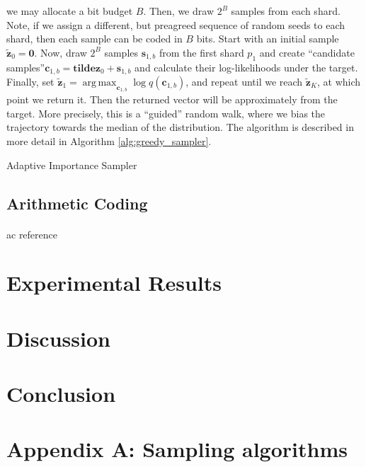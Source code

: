 \documentclass{article}
\renewcommand{\vec}[1]{\mathbf{#1}}
\DeclareMathOperator*{\argmax}{arg\,max}
\begin{document}
we may allocate a bit budget $B$. Then, we draw $2^B$ samples from each shard.
Note, if we assign a different, but preagreed sequence of random seeds to each
shard, then each sample can be coded in $B$ bits. Start with an initial sample
$\vec{\tilde{z}}_0 = \vec{0}$. Now, draw $2^B$ samples $\vec{s}_{1, b}$ from the
first shard $p_1$ and create ``candidate samples''$\vec{c}_{1, b} =
\vec{tilde{z}}_0 + \vec{s}_{1, b}$ and calculate their log-likelihoods under the
target. Finally, set $\vec{\tilde{z}}_1 = \argmax_{\vec{c}_{1, b}}\log
q(\vec{c}_{1, b})$, and repeat until we reach $\vec{\tilde{z}}_K$, at which
point we return it. Then the returned vector will be approximately from the
target. More precisely, this is a ``guided'' random walk, where we bias the
trajectory towards the median of the distribution. The algorithm is described in
more detail in Algorithm \ref{alg:greedy_sampler}.
\begin{algorithm}
  \caption{Adaptive Importance Sampler}
  \label{alg:adaptive_importance_sampler}
  \begin{algorithmic}
    \State
    \EndProcedure
  \end{algorithmic}
\end{algorithm}

\subsection{Arithmetic Coding}
\paragraph{}
ac reference \cite{rissanen1981universal}

\section{Experimental Results}

\cite{zhao2015loss}
\section{Discussion}
\section{Conclusion}

\cite{townsend2019practical}
\printbibliography

\newpage

\section*{Appendix A: Sampling algorithms}
\end{document}
